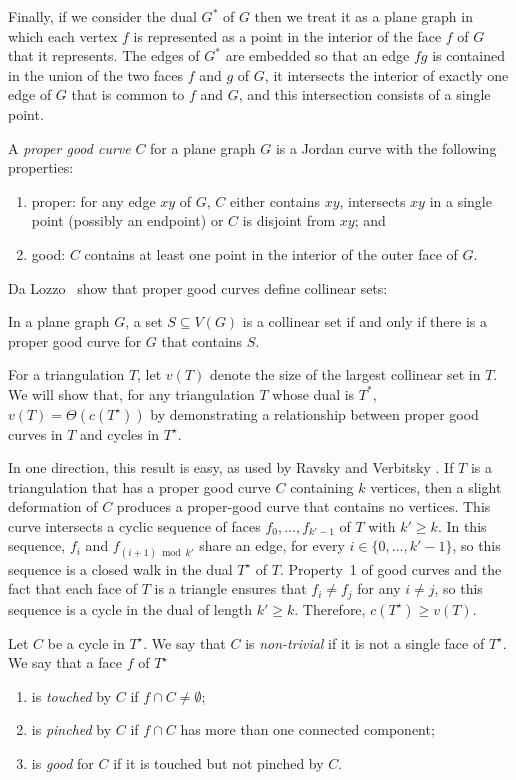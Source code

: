 \documentclass{patmorin}
\newcommand{\dual}[1]{{#1}^\star}
\begin{document}
Finally, if we consider the dual $G^*$ of $G$ then we treat it as a
plane graph in which each vertex $f$ is represented as a point in the
interior of the face $f$ of $G$ that it represents.  The edges of $G^*$
are embedded so that an edge $fg$ is contained in the union of the two
faces $f$ and $g$ of $G$, it intersects the interior of exactly one
edge of $G$ that is common to $f$ and $G$, and this intersection
consists of a single point.

A \emph{proper good curve} $C$ for a plane graph $G$ is a
Jordan curve with the following properties:
\begin{enumerate}
  \item proper: for any edge $xy$ of $G$, $C$ either contains $xy$, intersects
  $xy$ in a single point (possibly an endpoint) or $C$ is disjoint
  from $xy$; and
  \item good: $C$ contains at least one point in the interior of
  the outer face of $G$.
\end{enumerate}

Da Lozzo \etal\ show that proper good curves define collinear sets:

\begin{thm}
  In a plane graph $G$, a set $S\subseteq V(G)$ is a collinear set if
  and only if there is a proper good curve for $G$ that contains $S$.
\end{thm}

For a triangulation $T$, let $v(T)$ denote the size of the largest
collinear set in $T$.  We will show that, for any triangulation $T$
whose dual is $T^*$, $v(T)=\Theta(c(\dual{T}))$ by demonstrating a
relationship between proper good curves in $T$ and cycles in $\dual{T}$.

In one direction, this result is easy, as used by Ravsky and Verbitsky
\cite{ravsky.verbitsky:on,ravsky.verbitsky:on-arxiv}.  If $T$ is a
triangulation that has a proper good curve $C$ containing $k$ vertices,
then a slight deformation of $C$ produces a proper-good curve that
contains no vertices. This curve intersects a cyclic sequence of faces
$f_0,\ldots,f_{k'-1}$ of $T$ with $k'\ge k$.  In this sequence, $f_i$ and
$f_{(i+1)\bmod k'}$ share an edge, for every $i\in\{0,\ldots,k'-1\}$, so
this sequence is a closed walk in the dual $\dual{T}$ of $T$.  Property~1
of good curves and the fact that each face of $T$ is a triangle ensures
that $f_i\neq f_j$ for any $i\neq j$, so this sequence is a cycle in
the dual of length $k'\ge k$.  Therefore, $c(\dual{T})\ge v(T)$.

Let $C$ be a cycle in $\dual{T}$.  We say that $C$ is \emph{non-trivial} if it
is not a single face of $\dual{T}$.   We say that a face $f$ of $\dual{T}$ 
\begin{enumerate}
  \item is \emph{touched} by $C$ if $f\cap C\neq \emptyset$;
  \item is \emph{pinched} by $C$ if $f\cap C$ has more than one connected component;
  \item is \emph{good} for $C$ if it is touched but not pinched by $C$.
\end{enumerate}
\end{document}
